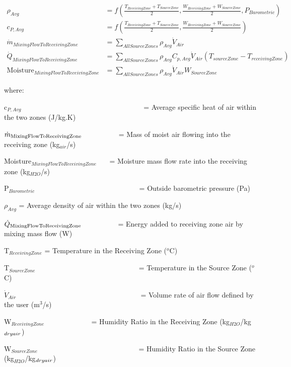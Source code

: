 \begin{equation}
 \begin{array}{cl}
    \rho_{Avg} & = f \left( \frac{T_{ReceivingZone} + T_{SourceZone}}{2},\frac{W_{ReceivingZone} + W_{SourceZone}}{2},P_{Barometric} \right) \\
    c_{P,Avg} & = f \left( \frac{T_{ReceivingZone} + T_{SourceZone}}{2},\frac{W_{ReceivingZone} + W_{SourceZone}}{2}\right) \\
    \dot m_{MixingFlowToReceivingZone} & = \sum_{AllSourceZones} \rho_{Avg}\dot V_{Air} \\
    \dot Q_{MixingFlowToReceivingZone} & = \sum_{AllSourceZones} \rho_{Avg}C_{p,Avg}\dot V_{Air}\left(T_{sourceZone}-T_{receivingZone}\right) \\
    \text{Moisture}_{MixingFlowToReceivingZone} & = \sum_{AllSourceZones} \rho_{Avg} \dot V_{Air} W_{SourceZone}
  \end{array}
\end{equation}

where:

c\(_{P,Avg}\)~~~~~~~~~~~~~~~~~~~~~~~~~~~~~~~~~~ = Average specific heat of air within the two zones (J/kg.K)

\({\dot m_{{\rm{MixingFlowToReceivingZone}}}}\) ~~~~~~~~~ = Mass of moist air flowing into the receiving zone (kg\(_{air}\)/s)

Moisture\(_{MixingFlowToReceivingZone}\)~~~ = Moisture mass flow rate into the receiving zone (kg\(_{H2O}\)/s)

P\(_{Barometric}\)~~~~~~~~~~~~~~~~~~~~~~~~~~~~~ = Outside barometric pressure (Pa)

\(\rho_{Avg}\) = Average density of air within the two zones (kg/s)

\({\dot Q_{{\rm{MixingFlowToReceivingZone}}}}\) ~~~~~~~~~ = Energy added to receiving zone air by mixing mass flow (W)

T\(_{ReceivingZone}\) = Temperature in the Receiving Zone (\(^{o}\)C)

T\(_{SourceZone}\) ~~~~~~~~~~~~~~~~~~~~~~~~~~~~ = Temperature in the Source Zone (\(^{o}\)C)

\({\dot V_{Air}}\) ~~~~~~~~~~~~~~~~~~~~~~~~~~~~~~~~~~ = Volume rate of air flow defined by the user (m\(^{3}\)/s)

W\(_{ReceivingZone}\) ~~~~~~~~~~~~ = Humidity Ratio in the Receiving Zone (kg\(_{H2O}\)/kg\(_{dry\\ air}\))

W\(_{SourceZone}\)~~~~~~~~~~~~~~~~~~~~~~~~~~~~ = Humidity Ratio in the Source Zone (kg\(_{H2O}\)/kg\(_{dry\\ air}\))

